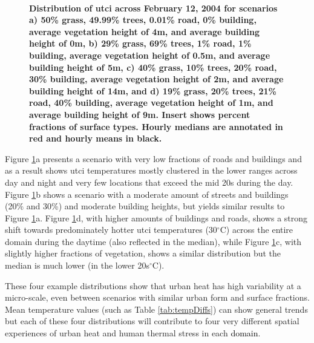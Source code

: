 \documentclass[final,3p,times,authoryear]{elsarticle}
\newcommand{\add}[1]{\textcolor{black}{#1}}
\newcommand{\remove}[1]{\textcolor{red}{\st{}}}
\begin{document}
\begin{figure}    
\captionsetup[subfigure]{labelformat=empty}    
\centering    
{}
\\
\caption{\bf Distribution of \gls{utci} across February 12, 2004 for scenarios a) 50\% grass, 49.99\% trees, 0.01\% road, 0\% building, average vegetation height of 4m, and average building height of 0m, b) 29\% grass, 69\% trees, 1\% road, 1\% building, average vegetation height of 0.5m, and average building height of 5m, c) 40\% grass, 10\% trees, 20\% road, 30\% building, average vegetation height of 2m, and average building height of 14m, and d) 19\% grass, 20\% trees, 21\% road, 40\% building, average vegetation height of 1m, and average building height of 9m. Insert shows percent fractions of surface types. Hourly medians are annotated in red and hourly means in black. } \label{fig:dist1}
\end{figure} 


Figure \ref{fig:dist1}a presents a scenario with very low fractions of roads and buildings and as a result shows \gls{utci} temperatures mostly clustered in the lower ranges across day and night and very few locations that exceed the mid 20s during the day. Figure \ref{fig:dist1}b shows a scenario with a moderate amount of streets and buildings (20\% and 30\%) and moderate building heights, but yields similar results to Figure \ref{fig:dist1}a. Figure \ref{fig:dist1}d, with higher amounts of buildings and roads, shows a strong shift towards predominately hotter \gls{utci} temperatures (30$^{\circ}$C) across the entire domain during the daytime (also reflected in the median), while Figure \ref{fig:dist1}c, with slightly higher fractions of vegetation, shows a similar distribution but the median is much lower (in the lower 20s$^{\circ}$C).


These four example distributions show that urban heat has high variability at a micro-scale, even between scenarios with similar urban form and surface fractions. Mean temperature values (such as Table \ref{tab:tempDiffs}) can show general trends but each of these four distributions will contribute to four very different spatial experiences of urban heat and human thermal stress in each \remove{area}\add{domain}.
\end{document}

